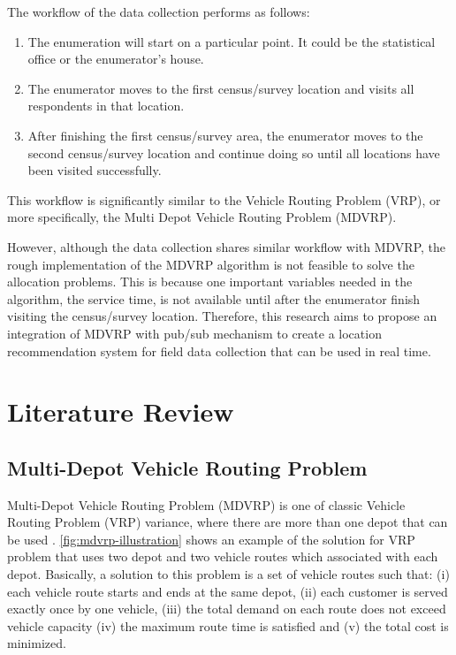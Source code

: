 \documentclass[conference]{IEEEtran}
\begin{document}
The workflow of the data collection performs as follows: 
\begin{enumerate}
	\item The enumeration will start on a particular point. It could be the statistical office or the enumerator's house. 
	\item The enumerator moves to the first census/survey location and visits all respondents in that location. 
	\item After finishing the first census/survey area, the enumerator moves to the second census/survey location and continue doing so until all locations have been visited successfully.
\end{enumerate}


This workflow is significantly similar to the Vehicle Routing Problem (VRP), or more specifically, the Multi Depot Vehicle Routing Problem (MDVRP).


However, although the data collection shares similar workflow with MDVRP, the rough implementation of the MDVRP algorithm is not feasible to solve the allocation problems. This is because one important variables needed in the algorithm, the service time, is not available until after the enumerator finish visiting the census/survey location. Therefore, this research aims to propose an integration of MDVRP with pub/sub mechanism to create a location recommendation system for field data collection that can be used in real time. 


\section{Literature Review}
\label{sec:literature-review}
\subsection{Multi-Depot Vehicle Routing Problem}
\label{ssec:mdvrp}
Multi-Depot Vehicle Routing Problem (MDVRP) is one of classic  Vehicle Routing Problem (VRP) variance, where there are more than one depot that can be used  \cite{montoya-torres_literature_2015}. \autoref{fig:mdvrp-illustration} shows an example of the solution for VRP problem that uses two depot and two vehicle routes which associated with each depot. Basically, a solution to this problem is a set of vehicle routes such that: (i) each vehicle route starts and ends at the same depot, (ii) each customer is served exactly once by one vehicle, (iii) the total demand on each route does not exceed vehicle capacity (iv) the maximum route time is satisfied and (v) the total cost is minimized.
\end{document}

